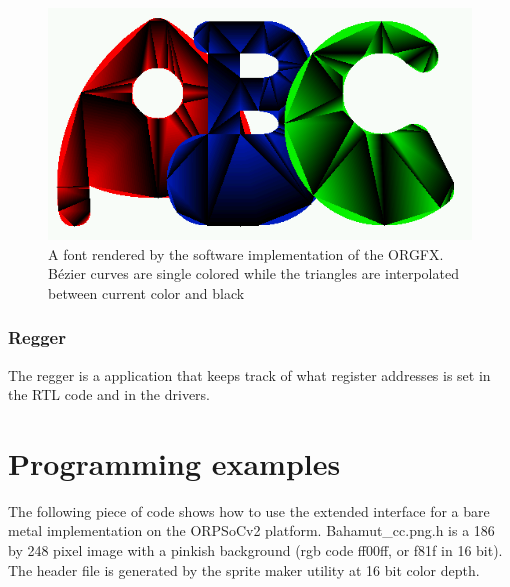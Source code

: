 \documentclass[10pt,a4paper]{article}
\begin{document}
\begin{figure}
\begin{center}
\includegraphics[scale=0.6]{../pictures/orsocgfxfont}
\caption{A font rendered by the software implementation of the ORGFX. B\'{e}zier curves are single colored while the triangles are interpolated between current color and black}
\label{fig:orsocgfxfont}
\end{center}
\end{figure}


\subsubsection{Regger}
The regger is a application that keeps track of what register addresses is set in the RTL code and in the drivers.

\section{Programming examples}
\label{sec:examples}
The following piece of code shows how to use the extended interface for a bare metal implementation on the ORPSoCv2 platform. Bahamut\_cc.png.h is a 186 by 248 pixel image with a pinkish background (rgb code ff00ff, or f81f in 16 bit). The header file is generated by the sprite maker utility at 16 bit color depth.
\end{document}
